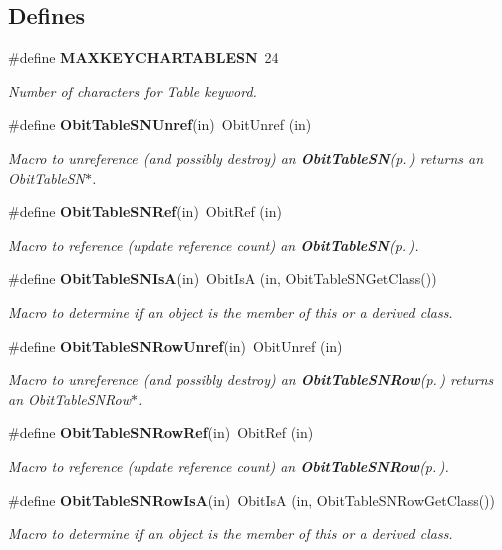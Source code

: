\subsection*{Defines}
\begin{CompactItemize}
\item 
\#define {\bf MAXKEYCHARTABLESN}\ 24
\begin{CompactList}\small\item\em Number of characters for Table keyword. \item\end{CompactList}\item 
\#define {\bf Obit\-Table\-SNUnref}(in)\ Obit\-Unref (in)
\begin{CompactList}\small\item\em Macro to unreference (and possibly destroy) an {\bf Obit\-Table\-SN}{\rm (p.\,\pageref{structObitTableSN})} returns an Obit\-Table\-SN$\ast$. \item\end{CompactList}\item 
\#define {\bf Obit\-Table\-SNRef}(in)\ Obit\-Ref (in)
\begin{CompactList}\small\item\em Macro to reference (update reference count) an {\bf Obit\-Table\-SN}{\rm (p.\,\pageref{structObitTableSN})}. \item\end{CompactList}\item 
\#define {\bf Obit\-Table\-SNIs\-A}(in)\ Obit\-Is\-A (in, Obit\-Table\-SNGet\-Class())
\begin{CompactList}\small\item\em Macro to determine if an object is the member of this or a derived class. \item\end{CompactList}\item 
\#define {\bf Obit\-Table\-SNRow\-Unref}(in)\ Obit\-Unref (in)
\begin{CompactList}\small\item\em Macro to unreference (and possibly destroy) an {\bf Obit\-Table\-SNRow}{\rm (p.\,\pageref{structObitTableSNRow})} returns an Obit\-Table\-SNRow$\ast$. \item\end{CompactList}\item 
\#define {\bf Obit\-Table\-SNRow\-Ref}(in)\ Obit\-Ref (in)
\begin{CompactList}\small\item\em Macro to reference (update reference count) an {\bf Obit\-Table\-SNRow}{\rm (p.\,\pageref{structObitTableSNRow})}. \item\end{CompactList}\item 
\#define {\bf Obit\-Table\-SNRow\-Is\-A}(in)\ Obit\-Is\-A (in, Obit\-Table\-SNRow\-Get\-Class())
\begin{CompactList}\small\item\em Macro to determine if an object is the member of this or a derived class. \item\end{CompactList}\end{CompactItemize}
